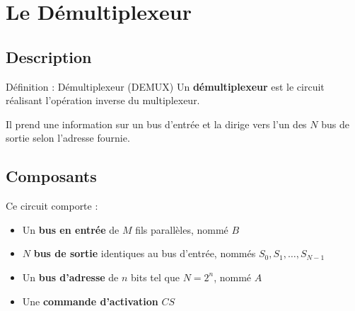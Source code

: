 \documentclass[a4paper,12pt]{article}
\begin{document}
\newpage
\section{Le Démultiplexeur}

\subsection{Description}

\begin{defbox}{Définition : Démultiplexeur (DEMUX)}
Un \textbf{démultiplexeur} est le circuit réalisant l'opération inverse du multiplexeur.

Il prend une information sur un bus d'entrée et la dirige vers l'un des $N$ bus de sortie selon l'adresse fournie.
\end{defbox}

\subsection{Composants}

Ce circuit comporte :
\begin{itemize}
    \item Un \textbf{bus en entrée} de $M$ fils parallèles, nommé $B$
    \item $N$ \textbf{bus de sortie} identiques au bus d'entrée, nommés $S_0, S_1, \ldots, S_{N-1}$
    \item Un \textbf{bus d'adresse} de $n$ bits tel que $N = 2^n$, nommé $A$
    \item Une \textbf{commande d'activation} $CS$
\end{itemize}

\begin{center}
\end{center}
\end{document}
